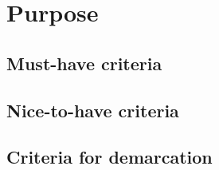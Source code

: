 \chapter{Purpose}
\section{Must-have criteria}
\section{Nice-to-have criteria}
\section{Criteria for demarcation}

